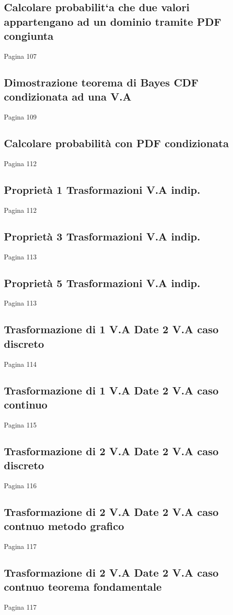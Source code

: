 \documentclass{article}
\begin{document}
\subsection{Calcolare probabilit`a che due valori appartengano ad un dominio tramite PDF congiunta}
Pagina 107
\subsection{Dimostrazione teorema di Bayes CDF condizionata ad una V.A}
Pagina 109
\subsection{Calcolare probabilità con PDF condizionata}
Pagina 112
\subsection{Proprietà 1 Trasformazioni V.A indip.}
Pagina 112
\subsection{Proprietà 3 Trasformazioni V.A indip.}
Pagina 113
\subsection{Proprietà 5 Trasformazioni V.A indip.}
Pagina 113
\subsection{Trasformazione di 1 V.A Date 2 V.A caso discreto}
Pagina 114
\subsection{Trasformazione di 1 V.A Date 2 V.A caso continuo}
Pagina 115
\subsection{Trasformazione di 2 V.A Date 2 V.A caso discreto}
Pagina 116
\subsection{Trasformazione di 2 V.A Date 2 V.A caso contnuo metodo grafico}
Pagina 117
\subsection{Trasformazione di 2 V.A Date 2 V.A caso contnuo teorema fondamentale}
Pagina 117
\end{document}
